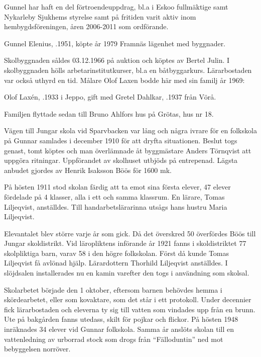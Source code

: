 Gunnel har haft en del förtroendeuppdrag, bl.a i  Eskoo fullmäktige samt Nykarleby Sjukhems styrelse samt på fritiden varit aktiv inom hembygdsföreningen, åren 2006-2011 som ordförande.




Gunnel Elenius, .1951, köpte år 1979 Framnäs lägenhet med byggnader.


Skolbyggnaden såldes 03.12.1966 på auktion och köptes av Bertel Julin.	I skolbyggnaden hölls arbetarinstitutkurser, bl.a en båtbyggarkurs. Lärarbostaden var också uthyrd en tid. Målare Olof Laxen bodde här med sin familj år 1969:

Olof Laxén, .1933 i Jeppo, gift med Gretel Dahlkar, .1937 från Vörå.
\begin{jhchildren}
  \item {}
  \item {}
\end{jhchildren}
Familjen flyttade sedan till Bruno Ahlfors hus på Grötas, hus nr 18.


Vägen till Jungar skola vid Sparvbacken var lång och några ivrare för en folkskola på Gunnar samlades i december 1910 för att dryfta situationen. Beslut togs genast, tomt köptes och man överlämnade åt byggmästare Anders Törnqvist att uppgöra ritningar. Uppförandet av skolhuset utbjöds på entrepenad. Lägsta anbudet gjordes av Henrik Isaksson Böös för 1600 mk.

På hösten 1911 stod skolan färdig att ta emot sina första elever, 47 elever fördelade på 4 klasser, alla i ett och samma klassrum. En lärare, Tomas Liljeqvist, anställdes. Till handarbetslärarinna utsågs hans hustru Maria Liljeqvist.

Elevantalet blev större varje år som gick. Då det överskred 50 överfördes Böös till Jungar skoldistrikt. Vid läropliktens införande år 1921 fanns i skoldistriktet 77 skolpliktiga barn, varav 58 i den högre folkskolan. Först då kunde Tomas Liljeqvist få avlönad hjälp. Lärardottern Thorhild Liljeqvist anställdes. I slöjdsalen installerades nu en kamin varefter den togs i användning som skolsal.

Skolarbetet började den 1 oktober, eftersom barnen behövdes hemma i skördearbetet, eller som kovaktare, som det står i ett protokoll. Under decennier fick lärarbostaden och eleverna ty sig till vatten som vindades upp från en brunn. Ute på bakgården fanns utedass, skilt för pojkar och flickor. På hösten 1948 inräknades 34 elever vid Gunnar folkskola. Samma år anslöts skolan till en vattenledning av urborrad stock som drogs från ``Fälloduntin'' ned mot bebyggelsen norröver.

